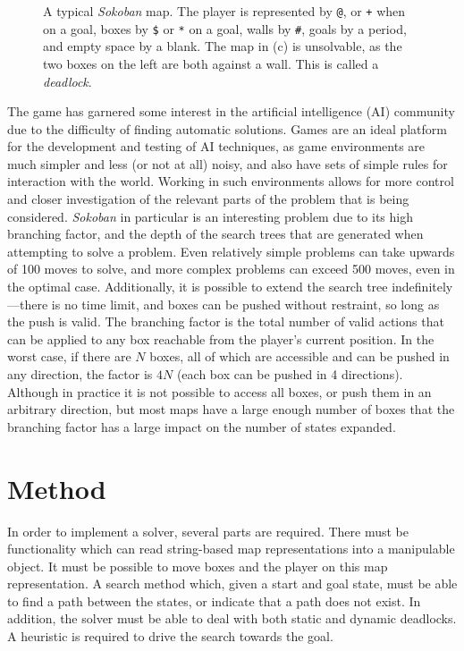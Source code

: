 \documentclass[a4paper,11pt]{article}
\begin{document}
\begin{figure}
  \caption{A typical \emph{Sokoban} map. The player is represented by \texttt{@}, or \texttt{+} when on a goal, boxes by \texttt{\$} or \texttt{*} on a goal, walls by \texttt{\#}, goals by a period, and empty space by a blank. The map in (c) is unsolvable, as the two boxes on the left are both against a wall. This is called a \emph{deadlock}.}
  \label{fig:mapex}
\end{figure}

The game has garnered some interest in the artificial intelligence (AI)
community due to the difficulty of finding automatic solutions. Games are an
ideal platform for the development and testing of AI techniques, as game
environments are much simpler and less (or not at all) noisy, and also have sets
of simple rules for interaction with the world. Working in such environments
allows for more control and closer investigation of the relevant parts of the
problem that is being considered. \emph{Sokoban} in particular is an interesting
problem due to its high branching factor, and the depth of the search trees that
are generated when attempting to solve a problem. Even relatively simple
problems can take upwards of 100 moves to solve, and more complex problems can
exceed 500 moves, even in the optimal case. Additionally, it is possible to
extend the search tree indefinitely---there is no time limit, and boxes can be
pushed without restraint, so long as the push is valid. The branching factor is
the total number of valid actions that can be applied to any box reachable from
the player's current position. In the worst case, if there are $N$ boxes, all of
which are accessible and can be pushed in any direction, the factor is $4N$
(each box can be pushed in 4 directions). Although in practice it is not
possible to access all boxes, or push them in an arbitrary direction, but most
maps have a large enough number of boxes that the branching factor has a large
impact on the number of states expanded.

\section{Method}

In order to implement a solver, several parts are required. There must be
functionality which can read string-based map representations into a manipulable
object. It must be possible to move boxes and the player on this map
representation. A search method which, given a start and goal state, must be
able to find a path between the states, or indicate that a path does not
exist. In addition, the solver must be able to deal with both static and dynamic
deadlocks. A heuristic is required to drive the search towards the goal.
\end{document}
